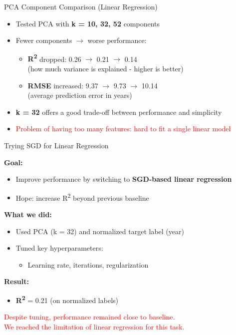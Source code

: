 \documentclass{beamer}
\begin{document}
\begin{frame}{PCA Component Comparison (Linear Regression)}

\begin{itemize}
    \item Tested PCA with \textbf{k = 10, 32, 52} components
    \item Fewer components $\rightarrow$ worse performance:
    \begin{itemize}
        \item \textbf{R\textsuperscript{2}} dropped: 0.26 $\rightarrow$ 0.21 $\rightarrow$ 0.14 \\
              \small (how much variance is explained - higher is better)
        \item \textbf{RMSE} increased: 9.37 $\rightarrow$ 9.73 $\rightarrow$ 10.14 \\
              \small (average prediction error in years)
    \end{itemize}
    \item \textbf{k = 32} offers a good trade-off between performance and simplicity
    \item \textcolor{red}{Problem of having too many features: hard to fit a single linear model}
\end{itemize}

\end{frame}



\begin{frame}{Trying SGD for Linear Regression}

\textbf{Goal:}
\begin{itemize}
    \item Improve performance by switching to \textbf{SGD-based linear regression}
    \item Hope: increase R\textsuperscript{2} beyond previous baseline
\end{itemize}

\textbf{What we did:}
\begin{itemize}
    \item Used PCA (k = 32) and normalized target label (year)
    \item Tuned key hyperparameters:
    \begin{itemize}
        \item Learning rate, iterations, regularization
    \end{itemize}
\end{itemize}

\textbf{Result:}
\begin{itemize}
    \item \textbf{R\textsuperscript{2}} = 0.21 (on normalized labels)
\end{itemize}

\textcolor{red}{
Despite tuning, performance remained close to baseline.
\\
We reached the limitation of linear regression for this task.
}

\end{frame}
\end{document}
